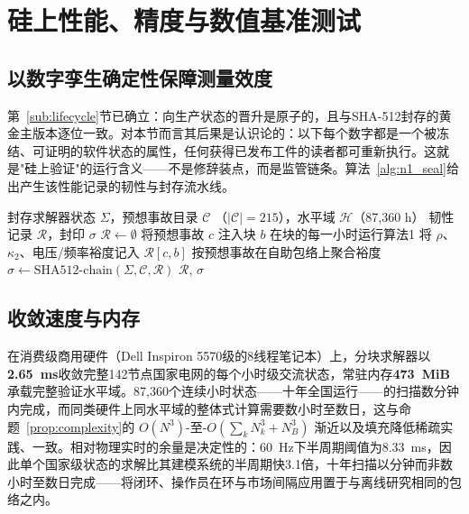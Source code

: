 \section{硅上性能、精度与数值基准测试}
\label{sec:benchmarking}

\subsection{以数字孪生确定性保障测量效度}
\label{sub:determinism}

第~\ref{sub:lifecycle}节已确立：向生产状态的晋升是原子的，且与SHA-512封存的黄金主版本逐位一致。对本节而言其后果是认识论的：以下每个数字都是一个被冻结、可证明的软件状态的属性，任何获得已发布工件的读者都可重新执行。这就是"硅上验证"的运行含义——不是修辞装点，而是监管链条。算法~\ref{alg:n1_seal}给出产生该性能记录的韧性与封存流水线。

\begin{algorithm}[!t]
\caption{带24小时块自助法与SHA-512封存的 $N$--$1$ 韧性扫描}
\label{alg:n1_seal}
\begin{algorithmic}[1]
\Require 封存求解器状态 $\Sigma$，预想事故目录 $\mathcal{C}$
         （$|\mathcal{C}| = 215$），水平域 $\mathcal{H}$（87,360 h）
\Ensure 韧性记录 $\mathcal{R}$，封印 $\sigma$
\State $\mathcal{R} \gets \emptyset$
 
    
      \State 将预想事故 $c$ 注入块 $b$
      \State 在块的每一小时运行算法1
      \State 将 $\rho$、$\kappa_2$、电压/频率裕度记入 $\mathcal{R}[c, b]$
   \EndFor
\EndFor
\State 按预想事故在自助包络上聚合裕度
\State $\sigma \gets \mathrm{SHA512}\text{-chain}(\Sigma, \mathcal{C}, \mathcal{R})$ 
\State \Return $\mathcal{R}$, $\sigma$
\end{algorithmic}
\end{algorithm}

\subsection{收敛速度与内存}
\label{sub:speed}

在消费级商用硬件（Dell Inspiron 5570级的8线程笔记本）上，分块求解器以\textbf{2.65~ms}收敛完整142节点国家电网的每个小时级交流状态，常驻内存\textbf{473~MiB}承载完整验证水平域。87,360个连续小时状态——十年全国运行——的扫描数分钟内完成，而同类硬件上同水平域的整体式计算需要数小时至数日，这与命题~\ref{prop:complexity}的 $O(N^3)$-至-$O(\sum_k N_k^3 + N_B^3)$ 渐近以及填充降低稀疏实践\cite{george1973}、\cite{saad2003}一致。相对物理实时的余量是决定性的：60~Hz下半周期阈值为8.33~ms，因此单个国家级状态的求解比其建模系统的半周期快3.1倍，十年扫描以分钟而非数小时至数日完成——将闭环、操作员在环与市场间隔应用置于与离线研究相同的包络之内。

